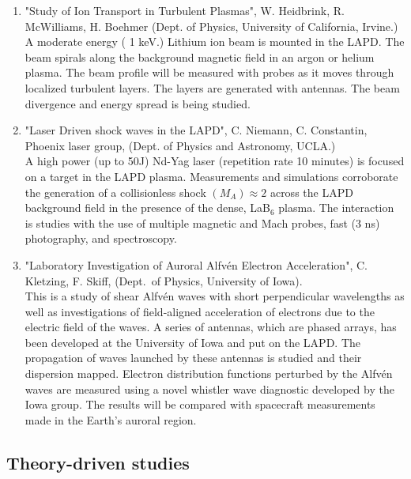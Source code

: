 \documentclass[11pt]{article}
\begin{document}
\begin{enumerate}
\item "Study of Ion Transport in Turbulent Plasmas", W. Heidbrink, R. McWilliams, H. Boehmer (Dept. of Physics, University of California, Irvine.)\\
A moderate energy ( 1 keV.) Lithium ion beam is mounted in the LAPD. The beam spirals along the background magnetic field in an argon or helium plasma. The beam profile will be measured with probes as it moves through localized turbulent layers. The layers are generated with antennas. The beam divergence and energy spread is being studied.

\item "Laser Driven shock waves in the LAPD", C. Niemann, C. Constantin, Phoenix laser group, (Dept. of Physics and Astronomy, UCLA.)\\
A high power (up to 50J) Nd-Yag laser (repetition rate 10 minutes) is focused on a target in the LAPD plasma. Measurements and simulations corroborate the generation of a collisionless shock $(M_{A})\approx 2$ across the LAPD background field in the presence of the dense, LaB$_{6}$ plasma. The interaction is studies with the use of multiple magnetic and Mach probes, fast (3 ns) photography, and spectroscopy.

\item "Laboratory Investigation of Auroral Alfv\'{e}n Electron Acceleration", C. Kletzing, F. Skiff, (Dept.\ of Physics, University of Iowa).\\
This is a study of shear Alfv\'{e}n waves with short perpendicular wavelengths as well as investigations of field-aligned acceleration of electrons due to the electric field of the waves. A series of antennas, which are phased arrays, has been developed at the University of Iowa and put on the LAPD. The propagation of waves launched by these antennas is studied and their dispersion mapped. Electron distribution functions perturbed by the Alfv\'{e}n waves are measured using a novel whistler wave diagnostic developed by the Iowa group. The results will be compared with spacecraft measurements made in the Earth's auroral region.



\end{enumerate}

\subsection{Theory-driven studies}
\end{document}

